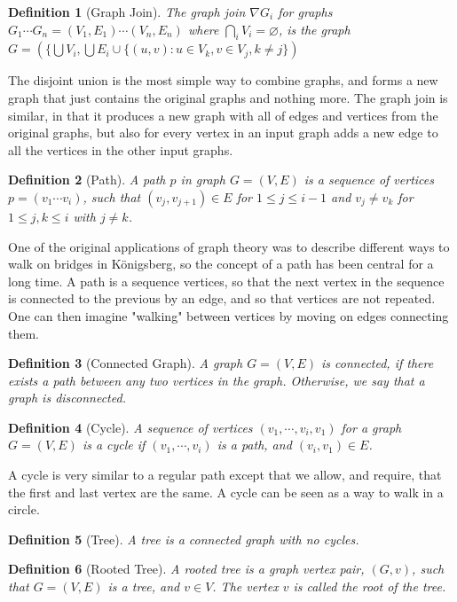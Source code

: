 \documentclass[a4paper]{article}
\newtheorem{definition}{Definition}[section]
\begin{document}
\begin{definition}[Graph Join]
    The graph join $\nabla G_i$ for graphs $G_1 \cdots G_n = (V_1,E_1) \cdots (V_n,E_n)$ where 
    $\bigcap_i V_i = \varnothing$, is the graph $G = (\{\bigcup V_i,
    \bigcup E_i \cup \{(u,v) : u \in V_k, v \in V_j, k \neq j \})$
\end{definition}

 The disjoint union is the
most simple way to combine graphs, and forms a new graph that just
contains the original graphs and nothing more.  The graph join is similar, in
that it produces a new graph with all of edges and vertices from the original
graphs, but also for every vertex in an input graph adds a new edge to all the vertices in the other
input graphs.



\begin{definition}[Path]
    A path $p$ in graph $G = (V,E)$ is a sequence of vertices $p = (v_1\cdots
    v_i)$, such that $(v_j,v_{j+1}) \in E$ for $1 \leq j \leq i-1$ and $v_j \neq v_k$ 
    for $1 \leq j,k \leq i$ with $j \neq k$.
\end{definition}

One of the original applications of graph theory was to describe different ways
to walk on bridges in Königsberg, so the concept of a path has been central for
a long time.  A path is a sequence vertices, so that the next vertex in the
sequence is connected to the previous by an edge, and so that vertices are not
repeated.  One can then imagine "walking" between vertices by moving on edges
connecting them.  


\begin{definition}[Connected Graph]
    A graph $G = (V,E)$ is connected, if there exists a path between any two
    vertices in the graph. Otherwise, we say that a graph is disconnected.
\end{definition}


\begin{definition}[Cycle]
    A sequence of vertices $(v_1,\cdots,v_i,v_1)$ for a graph $G = (V,E)$ is a cycle
    if $(v_1,\cdots,v_i)$ is a path, and $(v_i,v_1) \in E$.
\end{definition}

A cycle is very similar to a regular path except that we allow, and require,
that the first and last vertex are the same. A cycle can be seen as a way to walk
in a circle. 

\begin{definition}[Tree]{\cite{Trees}}
    A tree is a connected graph with no cycles.
\end{definition}
\begin{definition}[Rooted Tree]{\cite{Trees}}
    A rooted tree is a graph vertex pair, $(G,v)$, such that $G = (V,E)$ is a tree,
    and $v \in V$. The vertex $v$ is called the root of the tree.
\end{definition}
\end{document}
